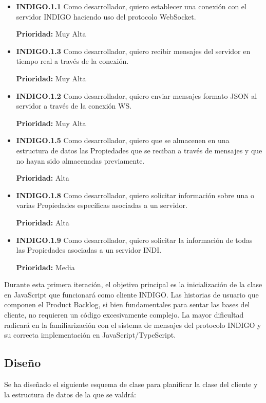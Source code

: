 \begin{itemize}[leftmargin=10mm]
	\item \textbf{INDIGO.1.1  }Como desarrollador, quiero establecer una conexión con el servidor INDIGO haciendo uso del protocolo WebSocket.
	
	\textbf{Prioridad:} Muy Alta
	\item \textbf{INDIGO.1.3  }Como desarrollador, quiero recibir mensajes del servidor en tiempo real a través de la conexión.
	
	\textbf{Prioridad:} Muy Alta
	\item \textbf{INDIGO.1.2  }Como desarrollador, quiero enviar mensajes formato JSON al servidor a través de la conexión WS.
	
	\textbf{Prioridad:} Muy Alta

	\item \textbf{INDIGO.1.5  }Como desarrollador, quiero que se almacenen en una estructura de datos las Propiedades que se reciban a través de mensajes y que no hayan sido almacenadas previamente.
	
	\textbf{Prioridad:} Alta
	\item \textbf{INDIGO.1.8  }Como desarrollador, quiero solicitar información sobre una o varias Propiedades específicas asociadas a un servidor.
	
	\textbf{Prioridad:} Alta

	\item \textbf{INDIGO.1.9 }Como desarrollador, quiero solicitar la información de todas las Propiedades asociadas a un servidor INDI.
	
	\textbf{Prioridad:} Media

\end{itemize}

Durante esta primera iteración, el objetivo principal es la inicialización de la clase en JavaScript que funcionará como cliente INDIGO. Las historias de usuario que componen el Product Backlog, si bien fundamentales para sentar las bases del cliente, no requieren un código excesivamente complejo. La mayor dificultad radicará en la familiarización con el sistema de mensajes del protocolo INDIGO y su correcta implementación en JavaScript/TypeScript.

\newpage

\subsection{Diseño}

Se ha diseñado el siguiente esquema de clase para planificar la clase del cliente y la estructura de datos de la que se valdrá:

